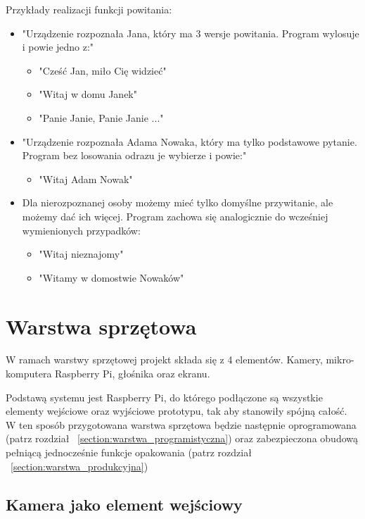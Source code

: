 \documentclass[a4paper,12pt,reqno]{article}
\begin{document}
Przykłady realizacji funkcji powitania:
\begin{itemize}
	\item "Urządzenie rozpoznała Jana, który ma 3 wersje powitania. Program wylosuje i powie jedno z:"
	\begin{itemize}
		\item "Cześć Jan, miło Cię widzieć"
		\item "Witaj w domu Janek"
		\item "Panie Janie, Panie Janie ..." %
	\end{itemize}
	\item "Urządzenie rozpoznała Adama Nowaka, który ma tylko podstawowe pytanie. Program bez losowania odrazu je wybierze i powie:"
	\begin{itemize}
		\item "Witaj Adam Nowak"
	\end{itemize}
	\item Dla nierozpoznanej osoby możemy mieć tylko domyślne przywitanie, ale możemy dać ich więcej. Program zachowa się analogicznie do wcześniej wymienionych przypadków:
	\begin{itemize}
		\item "Witaj nieznajomy"
		\item "Witamy w domostwie Nowaków"
	\end{itemize}
\end{itemize}

\newpage
\section{Warstwa sprzętowa} \label{section:warstwa_sprzetowa}

W ramach warstwy sprzętowej projekt składa się z 4 elementów. Kamery, mikro-komputera Raspberry Pi, głośnika oraz ekranu.

Podstawą systemu jest Raspberry Pi, do którego podłączone są wszystkie elementy wejściowe oraz wyjściowe prototypu, tak aby stanowiły spójną całość. W ten sposób przygotowana warstwa sprzętowa będzie następnie oprogramowana (patrz rozdział ~\ref{section:warstwa_programistyczna}) oraz zabezpieczona obudową pełniącą jednocześnie funkcje opakowania (patrz rozdział ~\ref{section:warstwa_produkcyjna})

\subsection{Kamera jako element wejściowy}
\end{document}
